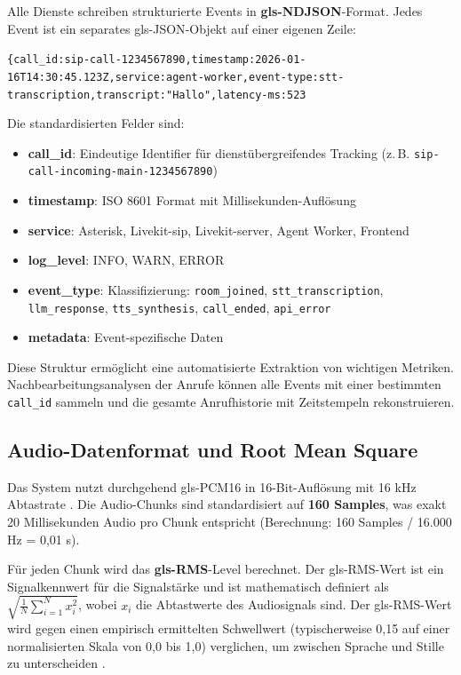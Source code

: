 Alle Dienste schreiben strukturierte Events in \textbf{\gls{gls-NDJSON}}-Format. Jedes Event ist ein separates \gls{gls-JSON}-Objekt auf einer eigenen Zeile:

\begin{center}
\texttt{\{call\_id:sip-call-1234567890,timestamp:2026-01-16T14:30:45.123Z,service:agent-worker,event-type:stt-transcription,transcript:"Hallo",latency-ms:523}
\end{center}

Die standardisierten Felder sind:

\begin{itemize}
  \item \textbf{call\_id}: Eindeutige Identifier für dienstübergreifendes Tracking (z.\,B. \texttt{sip-call-incoming-main-1234567890})
  \item \textbf{timestamp}: ISO 8601 Format mit Millisekunden-Auflösung
  \item \textbf{service}: Asterisk, Livekit-sip, Livekit-server, Agent Worker, Frontend
  \item \textbf{log\_level}: INFO, WARN, ERROR
  \item \textbf{event\_type}: Klassifizierung: \texttt{room\_joined},
\texttt{stt\_transcription}, \texttt{llm\_response}, \texttt{tts\_synthesis}, \texttt{call\_ended}, \texttt{api\_error}
  \item \textbf{metadata}: Event-spezifische Daten
\end{itemize}

Diese Struktur ermöglicht eine automatisierte Extraktion von wichtigen Metriken. Nachbearbeitungsanalysen der Anrufe können alle Events mit einer bestimmten \texttt{call\_id} sammeln und die gesamte Anrufhistorie mit Zeitstempeln rekonstruieren.

\subsection{Audio-Datenformat und Root Mean Square}

Das System nutzt durchgehend \gls{gls-PCM16} in 16-Bit-Auflösung mit 16 kHz Abtastrate \parencite{rfc3551}. Die Audio-Chunks sind standardisiert auf \textbf{160 Samples}, was exakt 20 Millisekunden Audio pro Chunk entspricht (Berechnung: 160 Samples / 16.000 Hz = 0,01 s).

Für jeden Chunk wird das \textbf{\gls{gls-RMS}}-Level berechnet. Der \gls{gls-RMS}-Wert ist ein Signalkennwert für die Signalstärke und ist mathematisch definiert als $\sqrt{\frac{1}{N}\sum_{i=1}^{N} x_i^2}$, wobei $x_i$ die Abtastwerte des Audiosignals sind. Der \gls{gls-RMS}-Wert wird gegen einen empirisch ermittelten Schwellwert (typischerweise 0,15 auf einer normalisierten Skala von 0,0 bis 1,0) verglichen, um zwischen Sprache und Stille zu unterscheiden \parencite{Czarnecki1992RMS}.

